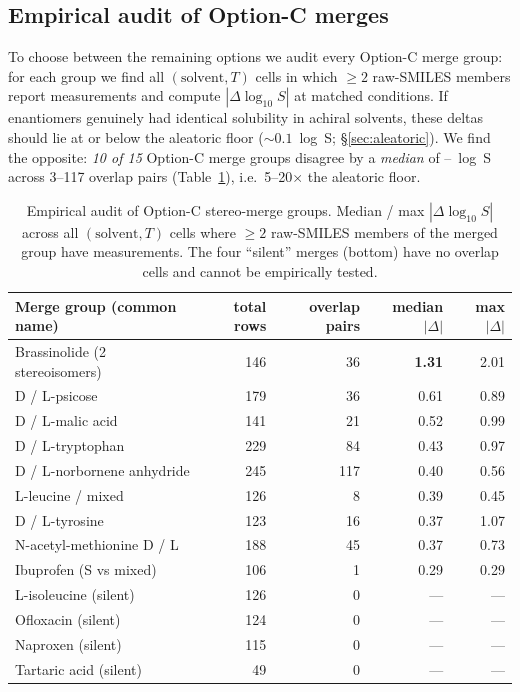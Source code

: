 \subsection{Empirical audit of Option-C merges}

To choose between the remaining options we audit every Option-C merge
group: for each group we find all $(\text{solvent}, T)$ cells in which
$\geq 2$ raw-SMILES members report measurements and compute
$|\Delta \log_{10} S|$ at matched conditions.  If enantiomers genuinely
had identical solubility in achiral solvents, these deltas should lie at
or below the aleatoric floor ($\sim 0.1$~log~S; §\ref{sec:aleatoric}).
We find the opposite: \emph{10 of 15} Option-C merge groups disagree by a
\emph{median} of --\textbf{}~log~S across
3--117 overlap pairs (Table~\ref{tab:stereo_audit}), i.e.\ 5--20$\times$
the aleatoric floor.

\begin{table}[h]
  \centering\small
  \caption{Empirical audit of Option-C stereo-merge groups.
    Median / max $|\Delta \log_{10} S|$ across all $(\mathrm{solvent}, T)$
    cells where $\ge 2$ raw-SMILES members of the merged group have
    measurements.  The four ``silent'' merges (bottom) have no overlap
    cells and cannot be empirically tested.}
  \label{tab:stereo_audit}
\begin{tabular}{@{}lrrrr@{}}
\toprule
Merge group (common name)              & total rows & overlap pairs & median $|\Delta|$ & max $|\Delta|$ \\
\midrule
Brassinolide (2 stereoisomers)         & 146 &  36 & \textbf{1.31} & 2.01 \\
D / L-psicose                          & 179 &  36 & 0.61 & 0.89 \\
D / L-malic acid                       & 141 &  21 & 0.52 & 0.99 \\
D / L-tryptophan                       & 229 &  84 & 0.43 & 0.97 \\
D / L-norbornene anhydride             & 245 & 117 & 0.40 & 0.56 \\
L-leucine / mixed                      & 126 &   8 & 0.39 & 0.45 \\
D / L-tyrosine                         & 123 &  16 & 0.37 & 1.07 \\
N-acetyl-methionine D / L              & 188 &  45 & 0.37 & 0.73 \\
Ibuprofen (S vs mixed)                 & 106 &   1 & 0.29 & 0.29 \\
\midrule
L-isoleucine (silent)                  & 126 &   0 &   --- &   --- \\
Ofloxacin (silent)                     & 124 &   0 &   --- &   --- \\
Naproxen (silent)                      & 115 &   0 &   --- &   --- \\
Tartaric acid (silent)                 &  49 &   0 &   --- &   --- \\
\bottomrule
\end{tabular}
\end{table}

